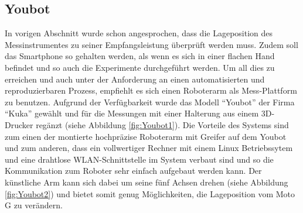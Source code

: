 \subsection{Youbot}\label{sec:You}
In vorigen Abschnitt wurde schon angesprochen, dass die Lageposition des Messinstrumentes zu seiner Empfangsleistung überprüft werden muss. Zudem soll das Smartphone so gehalten werden, als wenn es sich in einer flachen Hand befindet und so auch die Experimente durchgeführt werden. Um all dies zu erreichen und auch unter der Anforderung an einen automatisierten und reproduzierbaren Prozess, empfiehlt es sich einen Roboterarm als Mess-Plattform zu benutzen. Aufgrund der Verfügbarkeit wurde das Modell "`Youbot"' der Firma "`Kuka"' gewählt und für die Messungen mit einer Halterung aus einem 3D-Drucker regänzt (siehe Abbildung \ref{fig:Youbot1}). Die Vorteile des Systems sind zum einen der montierte hochpräzise Roboterarm mit Greifer auf dem Youbot und zum anderen, dass ein vollwertiger Rechner mit einem Linux Betriebssytem und eine drahtlose WLAN-Schnittstelle im System verbaut sind und so die Kommunikation zum Roboter sehr einfach aufgebaut werden kann. Der künstliche Arm kann sich dabei um seine fünf Achsen drehen (siehe Abbildung \ref{fig:Youbot2}) und bietet somit genug Möglichkeiten, die Lageposition vom Moto G zu verändern. 
